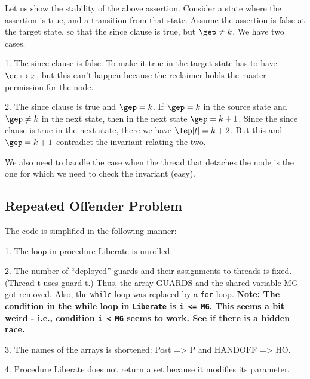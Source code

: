 Let us show the stability of the above assertion. Consider a state where the
assertion is true, and a transition from that state. Assume the assertion is
false at the target state, so that the since clause is true, but $\gep\not= k$.
We have two cases.

1. The since clause is false. To make it true in the target state has to have
$\cc \mapsto x$, but this can't happen because the reclaimer holds the master
permission for the node.

2. The since clause is true and $\gep = k$. If $\gep = k$ in the source state
and $\gep \not= k$ in the next state, then in the next state $\gep=k+1$. Since
the since clause is true in the next state, there we have $\lep[t] = k+2$. But
this and $\gep= k+1$ contradict the invariant relating the two.

We also need to handle the case when the thread that detaches the node is the
one for which we need to check the invariant (easy).


\subsection{Repeated Offender Problem}

The code is simplified in the following manner:

1. The loop in procedure Liberate is unrolled.

2. The number of ``deployed'' guards and their assignments to threads is fixed.
(Thread t uses guard t.) Thus, the array GUARDS and the shared variable MG got removed. Also, the \texttt{while} loop was replaced by a \texttt{for} loop.
\textbf{Note: The condition in the while loop in \texttt{Liberate} is \texttt{i <= MG}. This seems a bit weird - i.e., condition \texttt{i < MG} seems to work. See if there is a hidden race.}


3. The names of the arrays is shortened: Post => P and HANDOFF => HO.

4. Procedure Liberate does not return a set because it modifies its parameter.  



